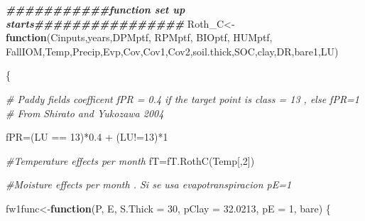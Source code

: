 \documentclass[
  10pt,
  b5paper,
]{book}
\newenvironment{Shaded}{\begin{snugshade}}{\end{snugshade}}
\newcommand{\AttributeTok}[1]{\textcolor[rgb]{0.77,0.63,0.00}{#1}}
\newcommand{\CommentTok}[1]{\textcolor[rgb]{0.56,0.35,0.01}{\textit{#1}}}
\newcommand{\ControlFlowTok}[1]{\textcolor[rgb]{0.13,0.29,0.53}{\textbf{#1}}}
\newcommand{\DecValTok}[1]{\textcolor[rgb]{0.00,0.00,0.81}{#1}}
\newcommand{\DocumentationTok}[1]{\textcolor[rgb]{0.56,0.35,0.01}{\textbf{\textit{#1}}}}
\newcommand{\FloatTok}[1]{\textcolor[rgb]{0.00,0.00,0.81}{#1}}
\newcommand{\FunctionTok}[1]{\textcolor[rgb]{0.00,0.00,0.00}{#1}}
\newcommand{\NormalTok}[1]{#1}
\newcommand{\OtherTok}[1]{\textcolor[rgb]{0.56,0.35,0.01}{#1}}
\newcommand{\SpecialCharTok}[1]{\textcolor[rgb]{0.00,0.00,0.00}{#1}}
\begin{document}
\begin{Shaded}
\begin{Highlighting}[]
\DocumentationTok{\#\#\#\#\#\#\#\#\#\#\#function set up starts\#\#\#\#\#\#\#\#\#\#\#\#\#\#\#\#}
\NormalTok{Roth\_C}\OtherTok{\textless{}{-}}\ControlFlowTok{function}\NormalTok{(Cinputs,years,DPMptf, RPMptf, BIOptf, HUMptf, FallIOM,Temp,Precip,Evp,Cov,Cov1,Cov2,soil.thick,SOC,clay,DR,bare1,LU)}

\NormalTok{\{}

\CommentTok{\# Paddy fields coefficent fPR = 0.4 if the target point is class = 13 , else fPR=1}
\CommentTok{\# From Shirato and Yukozawa 2004}

\NormalTok{fPR}\OtherTok{=}\NormalTok{(LU }\SpecialCharTok{==} \DecValTok{13}\NormalTok{)}\SpecialCharTok{*}\FloatTok{0.4} \SpecialCharTok{+}\NormalTok{ (LU}\SpecialCharTok{!=}\DecValTok{13}\NormalTok{)}\SpecialCharTok{*}\DecValTok{1}

\CommentTok{\#Temperature effects per month}
\NormalTok{fT}\OtherTok{=}\FunctionTok{fT.RothC}\NormalTok{(Temp[,}\DecValTok{2}\NormalTok{]) }

\CommentTok{\#Moisture effects per month . Si se usa evapotranspiracion pE=1}

\NormalTok{fw1func}\OtherTok{\textless{}{-}}\ControlFlowTok{function}\NormalTok{(P, E, }\AttributeTok{S.Thick =} \DecValTok{30}\NormalTok{, }\AttributeTok{pClay =} \FloatTok{32.0213}\NormalTok{, }\AttributeTok{pE =} \DecValTok{1}\NormalTok{, bare) }
\NormalTok{\{}
   

\end{Highlighting}
\end{Shaded}
\end{document}
